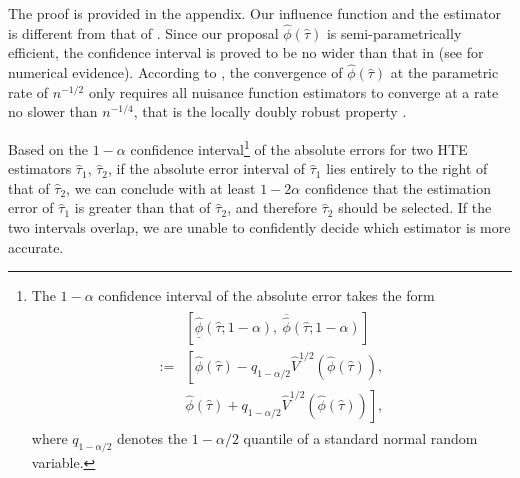 \documentclass[twoside]{article}
\newcommand{\1}{{\mathbbm{1}}}
\begin{document}
The proof is provided in the appendix.
Our influence function and the estimator is different from that of \cite[Theorem 2]{alaa2019validating}.
Since our proposal $\hat{\phi}(\hat{\tau})$ is semi-parametrically efficient, the confidence interval is proved to be no wider than that in \cite{alaa2019validating} (see  for numerical evidence).
According to , the convergence of $\hat{\phi}(\hat{\tau})$ at the parametric rate of $ n^{-1/2} $ only requires all nuisance function estimators to converge at a rate no slower than $ n^{-1/4}$, that is the locally doubly robust property \parencite{chernozhukov2018double}.


Based on the $1-\alpha$ confidence interval\footnote{The $1-\alpha$ confidence interval of the absolute error takes the form 
\begin{align}\label{eq:CI.absolute.error}
\begin{split}    
    &[\underline{\hat{\phi}}(\hat{\tau}; 1-\alpha), ~\overline{\hat{\phi}}(\hat{\tau}; 1-\alpha)]\\
    :=& \left[\hat{\phi}(\hat{\tau}) - q_{1-\alpha/2} \hat{V}^{1/2}(\hat{\phi}(\hat{\tau})), \right.\\
    &\left.\hat{\phi}(\hat{\tau}) + q_{1-\alpha/2} \hat{V}^{1/2}(\hat{\phi}(\hat{\tau}))\right],
\end{split}
\end{align} 
where $q_{1-\alpha/2}$ denotes the $1-\alpha/2$ quantile of a standard normal random variable.
} of the absolute errors for two HTE estimators $\hat{\tau}_1$, $\hat{\tau}_2$, if the absolute error interval of $\hat{\tau}_1$ lies entirely to the right of that of $\hat{\tau}_2$, we can conclude with at least $1-2\alpha$ confidence that the estimation error of $\hat{\tau}_1$ is greater than that of $\hat{\tau}_2$, and therefore $\hat{\tau}_2$ should be selected. 
If the two intervals overlap, we are unable to confidently decide which estimator is more accurate.
\end{document}

